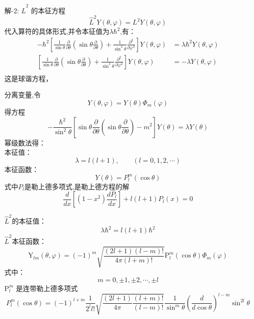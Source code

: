 \begin{frame} 
    \alert{解-2:} $\hat{L}^2$ 的本征方程
    $$\hat{L}^2Y(\theta,\varphi)=L^2 Y(\theta,\varphi)$$
    代入算符的具体形式,并令本征值为$\lambda\hbar^2$,有：
    \begin{equation*}
        \begin{split}
            -\hbar^{2}\left[\frac{1}{\sin \theta} \frac{\partial}{\partial \theta}\left(\sin \theta \frac{\partial}{\partial \theta}\right)+\frac{1}{\sin ^{2} \theta} \frac{\partial^{2}}{\partial \varphi^{2}}\right] Y(\theta,\varphi)&=\lambda\hbar^2 Y(\theta,\varphi) \\
            \left[\frac{1}{\sin \theta} \frac{\partial}{\partial \theta}\left(\sin \theta \frac{\partial}{\partial \theta}\right)+\frac{1}{\sin ^{2} \theta} \frac{\partial^{2}}{\partial \varphi^{2}}\right] Y(\theta,\varphi)&=-\lambda Y(\theta,\varphi) \\
        \end{split} 
    \end{equation*}
    这是球谐方程，
\end{frame} 

\begin{frame} 
    分离变量,令 
    \[ Y(\theta,\varphi)= Y(\theta)\Phi_m(\varphi)\]
    得方程
    \begin{equation}
        -\frac{\hbar^{2}}{\sin ^{2} \theta}\left[\sin \theta \frac{\partial}{\partial \theta}\left(\sin \theta \frac{\partial}{\partial \theta}\right)-m^{2}\right] Y(\theta)=\lambda Y(\theta)
    \end{equation}
    幂级数法得：\\
    本征值： $$\lambda=l(l+1), \qquad (l= 0,1,2,\cdots)$$ 
    本征函数：$$Y(\theta)=P_{l} ^m(\cos \theta)$$
    式中$P_{l}$是勒上德多项式,是勒上德方程的解 
    \begin{equation}
        \frac{d}{d x}\left[\left(1-x^{2}\right) \frac{d P_{l}}{d x}\right]+l(l+1) P_{l}(x)=0 
    \end{equation}
\end{frame} 

\begin{frame} 
    $\hat{L}^2$的本征值：$$\lambda\hbar^2=l(l+1)\hbar^2$$
    $\hat{L}^2$本征函数：
    $$
    \mathrm{Y}_{l m}(\theta, \varphi)=(-1)^{m} \sqrt{\frac{(2 l+1)(l-m) !}{4 \pi(l+m) !}} \mathrm{P}_{l}^{m}(\cos \theta) \Phi_{m}(\varphi)
    $$ 
    式中：
    $$ m=0,\pm 1,  \pm 2, \cdots, \pm l  $$
    $\mathrm{P}_{l}^{m} $ 是连带勒上德多项式
    $$
    P_{l}^{m}(\cos \theta)=(-1)^{l+m} \frac{1}{2^{l} l !} \sqrt{\frac{(2 l+1)}{4 \pi} \frac{(l+m) !}{(l-m) !} } \frac{1}{\sin ^{m} \theta}\left(\frac{d}{d \cos \theta}\right)^{l-m} \sin ^{2 l} \theta
    $$
\end{frame} 

